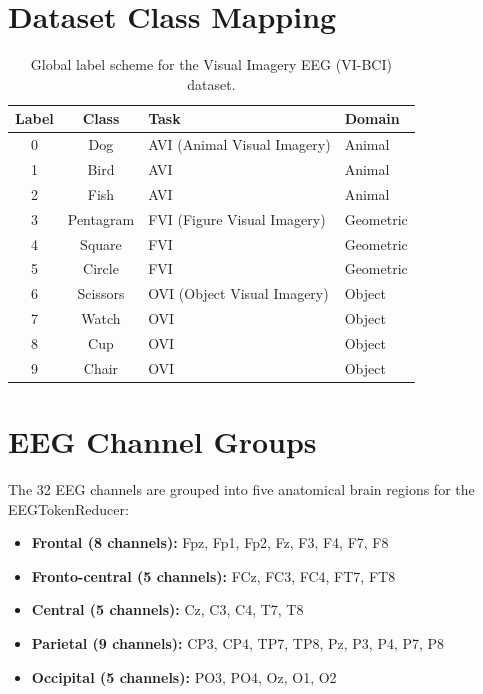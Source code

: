 \documentclass{article}
\begin{document}
\section{Dataset Class Mapping}
\label{app:class_mapping}

\begin{table}[h]
  \centering
  \caption{Global label scheme for the Visual Imagery EEG (VI-BCI) dataset.}
  \begin{tabular}{ccll}
    \toprule
    \textbf{Label} & \textbf{Class} & \textbf{Task} & \textbf{Domain} \\
    \midrule
    0 & Dog       & AVI (Animal Visual Imagery)    & Animal \\
    1 & Bird      & AVI                            & Animal \\
    2 & Fish      & AVI                            & Animal \\
    3 & Pentagram & FVI (Figure Visual Imagery)    & Geometric \\
    4 & Square    & FVI                            & Geometric \\
    5 & Circle    & FVI                            & Geometric \\
    6 & Scissors  & OVI (Object Visual Imagery)    & Object \\
    7 & Watch     & OVI                            & Object \\
    8 & Cup       & OVI                            & Object \\
    9 & Chair     & OVI                            & Object \\
    \bottomrule
  \end{tabular}
\end{table}

\section{EEG Channel Groups}
\label{app:channels}

The 32 EEG channels are grouped into five anatomical brain regions for the EEGTokenReducer:
\begin{itemize}[noitemsep]
  \item \textbf{Frontal (8 channels):} Fpz, Fp1, Fp2, Fz, F3, F4, F7, F8
  \item \textbf{Fronto-central (5 channels):} FCz, FC3, FC4, FT7, FT8
  \item \textbf{Central (5 channels):} Cz, C3, C4, T7, T8
  \item \textbf{Parietal (9 channels):} CP3, CP4, TP7, TP8, Pz, P3, P4, P7, P8
  \item \textbf{Occipital (5 channels):} PO3, PO4, Oz, O1, O2
\end{itemize}
\end{document}
